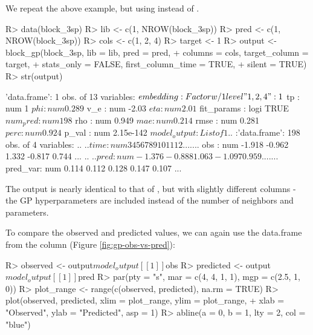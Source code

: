 \documentclass[article]{jss}
\begin{document}
We repeat the above example, but using  instead of . 

\begin{Schunk}
\begin{Sinput}
R> data(block_3sp)
R> lib <- c(1, NROW(block_3sp))
R> pred <- c(1, NROW(block_3sp))
R> cols <- c(1, 2, 4)
R> target <- 1
R> output <- block_gp(block_3sp, lib = lib, pred = pred,
+                     columns = cols, target_column = target,
+                     stats_only = FALSE, first_column_time = TRUE, 
+                     silent = TRUE)
R> str(output)
\end{Sinput}
\begin{Soutput}
'data.frame':	1 obs. of  13 variables:
 $ embedding   : Factor w/ 1 level "1, 2, 4": 1
 $ tp          : num 1
 $ phi         : num 0.289
 $ v_e         : num -2.03
 $ eta         : num 2.01
 $ fit_params  : logi TRUE
 $ num_pred    : num 198
 $ rho         : num 0.949
 $ mae         : num 0.214
 $ rmse        : num 0.281
 $ perc        : num 0.924
 $ p_val       : num 2.15e-142
 $ model_output:List of 1
  ..$ :'data.frame':	198 obs. of  4 variables:
  .. ..$ time    : num  3 4 5 6 7 8 9 10 11 12 ...
  .. ..$ obs     : num  -1.918 -0.962 1.332 -0.817 0.744 ...
  .. ..$ pred    : num  -1.376 -0.888 1.063 -1.097 0.959 ...
  .. ..$ pred_var: num  0.114 0.112 0.128 0.147 0.107 ...
\end{Soutput}
\end{Schunk}

The output is nearly identical to that of , but with slightly different columns - the GP hyperparameters are included instead of the number of neighbors and  parameters.

To compare the observed and predicted values, we can again use the data.frame from the  column (Figure \ref{fig:gp-obs-vs-pred}):

\begin{Schunk}
\begin{Sinput}
R> observed <- output$model_output[[1]]$obs
R> predicted <- output$model_output[[1]]$pred
R> par(pty = "s", mar = c(4, 4, 1, 1), mgp = c(2.5, 1, 0))
R> plot_range <- range(c(observed, predicted), na.rm = TRUE)
R> plot(observed, predicted, xlim = plot_range, ylim = plot_range,
+       xlab = "Observed", ylab = "Predicted", asp = 1)
R> abline(a = 0, b = 1, lty = 2, col = "blue")
\end{Sinput}
\end{Schunk}
\end{document}

